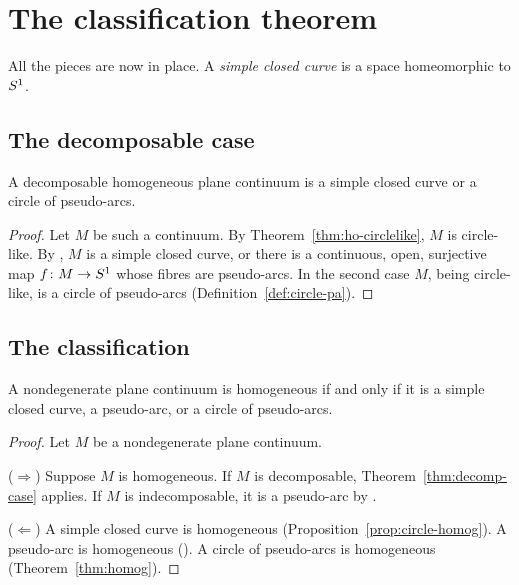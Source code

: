 \chapter{The classification theorem}\label{ch:classification}

All the pieces are now in place. A \emph{simple closed curve} is a space homeomorphic to $S^1$.

\section{The decomposable case}

\begin{theorem}\label{thm:decomp-case}
A decomposable homogeneous plane continuum is a simple closed curve or a circle of pseudo-arcs.
\end{theorem}

\begin{proof}
Let $M$ be such a continuum. By Theorem~\ref{thm:ho-circlelike}, $M$ is circle-like. By , $M$ is a simple closed curve, or there is a continuous, open, surjective map
$f\colon M\to S^1$ whose fibres are pseudo-arcs. In the second case $M$, being circle-like, is a circle of pseudo-arcs (Definition~\ref{def:circle-pa}).
\end{proof}


\section{The classification}

\begin{theorem}\label{thm:classification}
A nondegenerate plane continuum is homogeneous if and only if it is a simple closed curve, a pseudo-arc, or a circle of pseudo-arcs.
\end{theorem}

\begin{proof}
Let $M$ be a nondegenerate plane continuum.

($\Rightarrow$) Suppose $M$ is homogeneous. If $M$ is decomposable, Theorem~\ref{thm:decomp-case} applies. If $M$ is indecomposable, it is a pseudo-arc by .

($\Leftarrow$) A simple closed curve is homogeneous (Proposition~\ref{prop:circle-homog}). A pseudo-arc is homogeneous (). A circle of pseudo-arcs is homogeneous
(Theorem~\ref{thm:homog}).
\end{proof}

